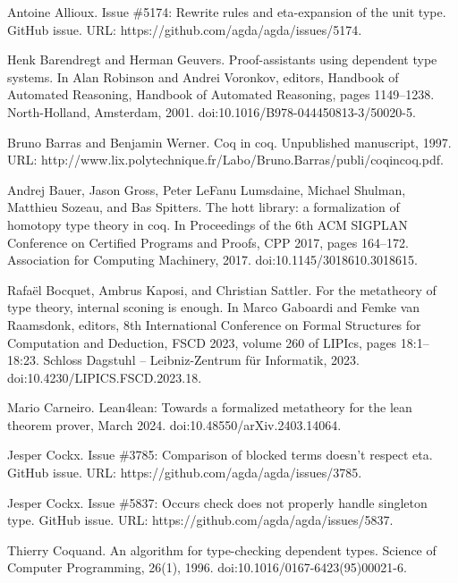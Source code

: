 \par\noindent  [8]  Antoine Allioux.  Issue \#5174: Rewrite rules and eta-expansion of the unit type.  GitHub issue.  URL: https://github.com/agda/agda/issues/5174.  
 
\par\noindent  [9]  Henk Barendregt and Herman Geuvers.  Proof-assistants using dependent type systems.  In Alan Robinson and Andrei Voronkov, editors, Handbook of Automated Reasoning, Handbook of Automated Reasoning, pages 1149–1238. North-Holland, Amsterdam, 2001.  doi:10.1016/B978-044450813-3/50020-5.  
 
\par\noindent  [10]  Bruno Barras and Benjamin Werner.  Coq in coq.  Unpublished manuscript, 1997.  URL: http://www.lix.polytechnique.fr/Labo/Bruno.Barras/publi/coqincoq.pdf.  
 
\par\noindent  [11]  Andrej Bauer, Jason Gross, Peter LeFanu Lumsdaine, Michael Shulman, Matthieu Sozeau, and Bas Spitters.  The hott library: a formalization of homotopy type theory in coq.  In Proceedings of the 6th ACM SIGPLAN Conference on Certified Programs and Proofs, CPP 2017, pages 164–172. Association for Computing Machinery, 2017.  doi:10.1145/3018610.3018615.  
 
\par\noindent  [12]  Rafaël Bocquet, Ambrus Kaposi, and Christian Sattler.  For the metatheory of type theory, internal sconing is enough.  In Marco Gaboardi and Femke van Raamsdonk, editors, 8th International Conference on Formal Structures for Computation and Deduction, FSCD 2023, volume 260 of LIPIcs, pages 18:1–18:23. Schloss Dagstuhl – Leibniz-Zentrum für Informatik, 2023.  doi:10.4230/LIPICS.FSCD.2023.18.  
 
\par\noindent  [13]  Mario Carneiro.  Lean4lean: Towards a formalized metatheory for the lean theorem prover, March 2024.  doi:10.48550/arXiv.2403.14064.  
 
\par\noindent  [14]  Jesper Cockx.  Issue \#3785: Comparison of blocked terms doesn’t respect eta.  GitHub issue.  URL: https://github.com/agda/agda/issues/3785.  
 
\par\noindent  [15]  Jesper Cockx.  Issue \#5837: Occurs check does not properly handle singleton type.  GitHub issue.  URL: https://github.com/agda/agda/issues/5837.  
 
\par\noindent  [16]  Thierry Coquand.  An algorithm for type-checking dependent types.  Science of Computer Programming, 26(1), 1996.  doi:10.1016/0167-6423(95)00021-6.  
 
